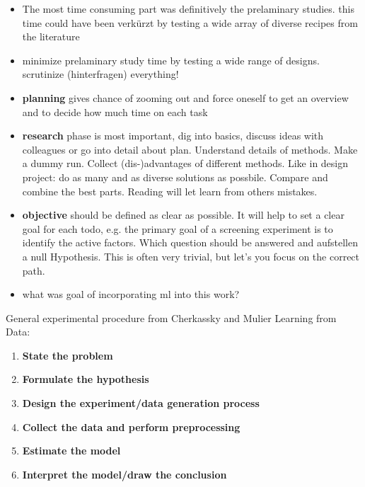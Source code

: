 \begin{itemize}
    \item The most time consuming part was definitively the prelaminary studies. this time could have been verkürzt by testing a wide array of diverse recipes from the literature
    \item minimize prelaminary study time by testing a wide range of designs. scrutinize (hinterfragen) everything!
    \item \textbf{planning} gives chance of zooming out and force oneself to get an overview and to decide how much time on each task
    \item \textbf{research} phase is most important, dig into basics, discuss ideas with colleagues or go into detail about plan. Understand details of methods. Make a dummy run. Collect (dis-)advantages of different methods. Like in design project: do as many and as diverse solutions as possbile. Compare and combine the best parts. Reading will let learn from others mistakes. \\ 
    \item \textbf{objective} should be defined as clear as possible. It will help to set a clear goal for each todo, e.g. the primary goal of a screening experiment is to identify the active factors.\cite{miller2001using} Which question should be answered and aufstellen a null Hypothesis. This is often very trivial, but let's you focus on the correct path. 
    \item what was goal of incorporating ml into this work? 
\end{itemize}
General experimental procedure from Cherkassky and Mulier Learning from Data\cite{cherkassky1998learning}:
\begin{enumerate}
    \item \textbf{State the problem}
    \item \textbf{Formulate the hypothesis}
    \item \textbf{Design the experiment/data generation process}
    \item \textbf{Collect the data and perform preprocessing}
    \item \textbf{Estimate the model}
    \item \textbf{Interpret the model/draw the conclusion}
\end{enumerate}
